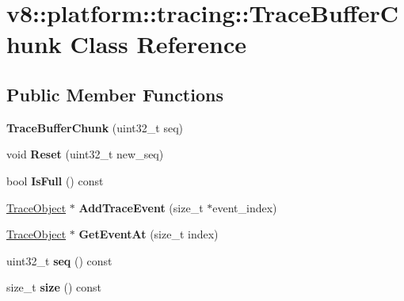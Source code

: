 \hypertarget{classv8_1_1platform_1_1tracing_1_1TraceBufferChunk}{}\section{v8\+:\+:platform\+:\+:tracing\+:\+:Trace\+Buffer\+Chunk Class Reference}
\label{classv8_1_1platform_1_1tracing_1_1TraceBufferChunk}
\subsection*{Public Member Functions}
\begin{DoxyCompactItemize}
\item 
\mbox{\label{classv8_1_1platform_1_1tracing_1_1TraceBufferChunk_a553b81d9a3c51fece0361a769e8d55ed}} 
{\bfseries Trace\+Buffer\+Chunk} (uint32\+\_\+t seq)
\item 
\mbox{\label{classv8_1_1platform_1_1tracing_1_1TraceBufferChunk_a826d9e811145daf9ce45eb217e42869d}} 
void {\bfseries Reset} (uint32\+\_\+t new\+\_\+seq)
\item 
\mbox{\label{classv8_1_1platform_1_1tracing_1_1TraceBufferChunk_a7d9492b110b2fff2b56d4b8ff7acab66}} 
bool {\bfseries Is\+Full} () const
\item 
\mbox{\label{classv8_1_1platform_1_1tracing_1_1TraceBufferChunk_a697a25f0a45faf59feebde6c1a61ed66}} 
\mbox{\hyperlink{classv8_1_1platform_1_1tracing_1_1TraceObject}{Trace\+Object}} $\ast$ {\bfseries Add\+Trace\+Event} (size\+\_\+t $\ast$event\+\_\+index)
\item 
\mbox{\label{classv8_1_1platform_1_1tracing_1_1TraceBufferChunk_ad3f2e762a6399317745b2b6553618967}} 
\mbox{\hyperlink{classv8_1_1platform_1_1tracing_1_1TraceObject}{Trace\+Object}} $\ast$ {\bfseries Get\+Event\+At} (size\+\_\+t index)
\item 
\mbox{\label{classv8_1_1platform_1_1tracing_1_1TraceBufferChunk_a3ef801b00f591dab1e0222730328c605}} 
uint32\+\_\+t {\bfseries seq} () const
\item 
\mbox{\label{classv8_1_1platform_1_1tracing_1_1TraceBufferChunk_a0da81d83e57507fed594521aea0640b5}} 
size\+\_\+t {\bfseries size} () const
\end{DoxyCompactItemize}
